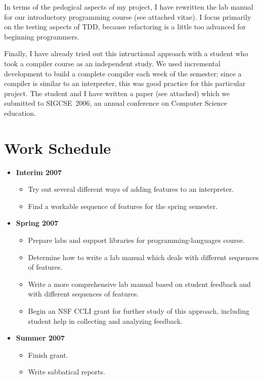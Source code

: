 \documentclass{article}
\begin{document}
In terms of the pedogical aspects of my project, I have rewritten the lab manual for our introductory programming course (see attached vitae).  I focus primarily on the testing aspects of TDD, because refactoring is a little too advanced for beginning programmers.

Finally, I have already tried out this intructional approach with a student who took a compiler course as an independent study.  We used incremental development to build a complete compiler each week of the semester; since a compiler is similar to an interpreter, this was good practice for this particular project.  The student and I have written a paper (see attached) which we submitted to SIGCSE~2006, an annual conference on Computer Science education.


\newpage
\section*{Work Schedule}

\begin{itemize}
  \item \textbf{Interim 2007}
    \begin{itemize}
    \item Try out several different ways of adding features to an interpreter.
    \item Find a workable sequence of features for the spring semester.
    \end{itemize}
  \item \textbf{Spring 2007}
    \begin{itemize}
    \item Prepare labs and support libraries for programming-languages course.
    \item Determine how to write a lab manual which deals with different sequences of features.
    \item Write a more comprehensive lab manual based on student feedback and with different sequences of features.
    \item Begin an NSF CCLI grant for further study of this approach, including student help in collecting and analyzing feedback.
    \end{itemize}
  \item \textbf{Summer 2007}
    \begin{itemize}
    \item Finish grant.
    \item Write sabbatical reports.
    \end{itemize}
\end{itemize}
\end{document}
